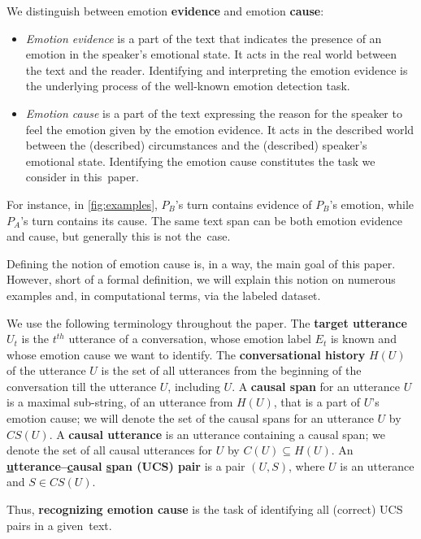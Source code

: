 \documentclass[smallextended]{svjour3}
\newcommand\0{\hphantom{0}}
\begin{document}
We distinguish between emotion \textbf{evidence} and emotion \textbf{cause}:
\begin{itemize}[itemsep=0ex,leftmargin=*]
    \item \textit{Emotion evidence} is a part of the text that indicates the presence of an emotion in the speaker's emotional state. It acts in the real world between the text and the reader. 
Identifying and interpreting the emotion evidence is the underlying process of the well-known emotion detection task. 
    
    \item \textit{Emotion cause} is a part of the text expressing the reason for the speaker to feel the emotion given by the emotion evidence. It acts in the 
described world
    between the (described) circumstances and the (described) speaker's emotional state. Identifying the emotion cause constitutes the task we consider in this~paper.
\end{itemize}
For instance, in \cref{fig:examples}, $P_B$'s turn contains evidence of $P_B$'s emotion, while $P_A$'s turn contains its cause.
The same text span can be both emotion evidence and cause, but generally this is not the~case.

Defining the notion of emotion cause is, in a way, the main goal of this paper. However, short of a formal definition, we will explain this notion on numerous examples and, in computational terms, via the labeled dataset. 


We use the following terminology throughout the paper. 
The \textbf{target utterance} $U_t$ is the $t^{th}$ utterance of a conversation, whose emotion label $E_t$ is known and whose emotion cause we want to identify.
The \textbf{conversational history} $H(U)$ of the utterance $U$ is the set of all utterances from the beginning of the conversation till the utterance $U$, including $U$.
A \textbf{causal span} for an utterance $U$ is a maximal sub-string, of an utterance from $H(U)$, that is a part of $U$'s emotion cause; we will denote the set of the causal spans for an utterance $U$ by $CS(U)$.
A \textbf{causal utterance} is an utterance containing a causal span; we denote the set of all causal utterances for $U$ by $C(U)\subseteq H(U)$.
An \textbf{\underline utterance--\underline causal \underline span (UCS) pair} is a pair $(U,S)$, where $U$ is an utterance and $S\in CS(U)$.

Thus, \textbf{recognizing emotion cause} is the task of identifying all (correct) UCS pairs in a given~text.
\end{document}
